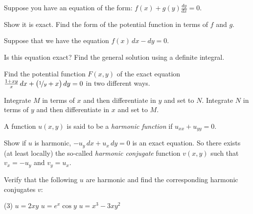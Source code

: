 \documentclass{ximera}
\begin{document}
\begin{exercise}
    Suppose you have an equation of the form: $f(x) + g(y) \frac{dy}{dx} = 0$.
    \begin{tasks}
        \task Show it is exact.
        \task Find the form of the potential function in terms of $f$ and $g$.
    \end{tasks}
\end{exercise}

\begin{exercise}
    Suppose that we have the equation $f(x) \, dx - dy = 0$.
    \begin{tasks}
        \task Is this equation exact?
        \task Find the general solution using a definite integral.
    \end{tasks}
\end{exercise}

\begin{exercise}
    Find the potential function $F(x,y)$ of the exact equation $\frac{1+xy}{x}\, dx + \bigl(\nicefrac{1}{y} + x \bigr) \, dy = 0$ in two different ways.
    \begin{tasks}
        \task Integrate $M$ in terms of $x$ and then differentiate in $y$ and set to $N$.
        \task Integrate $N$ in terms of $y$ and then differentiate in $x$ and set to $M$.
    \end{tasks}
\end{exercise}

\begin{samepage}
    \begin{exercise}
        A function $u(x,y)$ is said to be a \emph{harmonic function} if $u_{xx} + u_{yy} = 0$.
        \begin{tasks}
            \task Show if $u$ is harmonic, $-u_y \, dx + u_x \, dy = 0$ is an exact equation.  So there exists (at least locally) the so-called \emph{harmonic conjugate} function $v(x,y)$ such that $v_x = -u_y$ and $v_y = u_x$.
        \end{tasks}
        Verify that the following $u$ are harmonic and 
        find the corresponding harmonic conjugates $v$:
        \begin{tasks}[resume](3)
            \task $u = 2xy$
            \task $u = e^x \cos y$
            \task $u = x^3-3xy^2$
        \end{tasks}
    \end{exercise}
\end{samepage}
\end{document}
